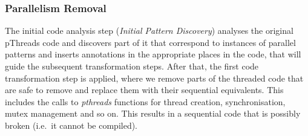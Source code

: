 \subsubsection{Parallelism Removal}
The initial code analysis step (\emph{Initial Pattern Discovery}) analyses the original pThreads code and discovers part of it that correspond to instances of parallel patterns and inserts annotations in the appropriate places in the code, that will guide the subsequent transformation steps. After that, the first code transformation step is applied, where we remove parts of the threaded code that are safe to remove and replace them with their sequential equivalents. This includes the calls to \emph{pthreads} functions for thread creation, synchronisation, mutex management and so on. This results in a sequential code that is possibly broken (i.e.~it cannot be compiled). %


    




